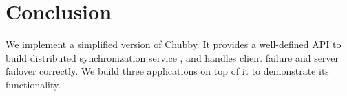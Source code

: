 \section{Conclusion}

We implement a simplified version of Chubby.
It provides a well-defined API to build distributed synchronization service
, and handles client failure and server failover correctly.
We build three applications on top of it to demonstrate its functionality.
